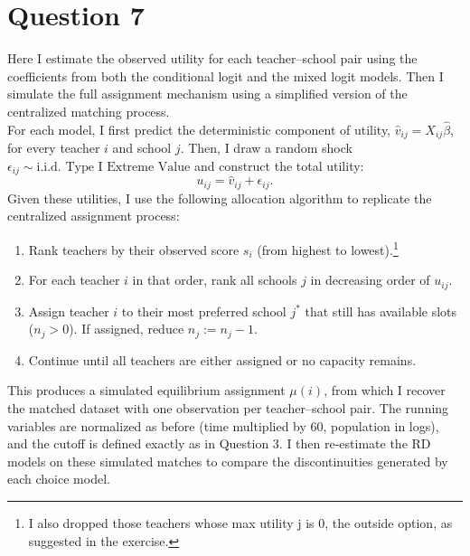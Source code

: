 \documentclass{article}
\begin{document}
\section*{Question 7}

Here I estimate the observed utility for each teacher–school pair using the coefficients from both the conditional logit and the mixed logit models. Then I simulate the full assignment mechanism using a simplified version of the centralized matching process. \\

For each model, I first predict the deterministic component of utility, $\hat{v}_{ij} = X_{ij}\hat{\beta}$, for every teacher $i$ and school $j$. Then, I draw a random shock $\epsilon_{ij} \sim \text{i.i.d. Type I Extreme Value}$ and construct the total utility:
\[
u_{ij} = \hat{v}_{ij} + \epsilon_{ij}.
\]
Given these utilities, I use the following allocation algorithm to replicate the centralized assignment process:

\begin{enumerate}
    \item Rank teachers by their observed score $s_i$ (from highest to lowest).\footnote{I also dropped those teachers whose max utility j is 0, the outside option, as suggested in the exercise.}
    \item For each teacher $i$ in that order, rank all schools $j$ in decreasing order of $u_{ij}$.
    \item Assign teacher $i$ to their most preferred school $j^*$ that still has available slots ($n_j>0$). If assigned, reduce $n_j := n_j - 1$.
    \item Continue until all teachers are either assigned or no capacity remains.
\end{enumerate}

This produces a simulated equilibrium assignment $\mu(i)$, from which I recover the matched dataset with one observation per teacher–school pair. The running variables are normalized as before (time multiplied by 60, population in logs), and the cutoff is defined exactly as in Question 3. I then re-estimate the RD models on these simulated matches to compare the discontinuities generated by each choice model.
\end{document}
